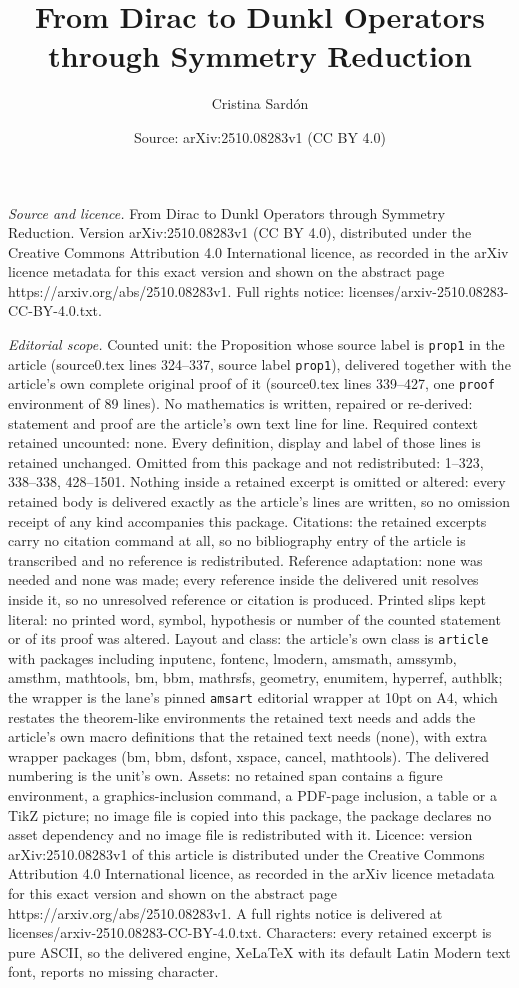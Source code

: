\documentclass[10pt,a4paper]{amsart}
\title[From Dirac to Dunkl Operators through Symmetry Reduction]{From Dirac to Dunkl Operators through Symmetry Reduction}
\author{Cristina Sard\'on}
\date{Source: arXiv:2510.08283v1 (CC BY 4.0)}
\begin{document}
\maketitle

\noindent\emph{Source and licence.} From Dirac to Dunkl Operators through Symmetry Reduction. Version arXiv:2510.08283v1 (CC BY 4.0), distributed under the Creative Commons Attribution 4.0 International licence, as recorded in the arXiv licence metadata for this exact version and shown on the abstract page https://arxiv.org/abs/2510.08283v1. Full rights notice: licenses/arxiv-2510.08283-CC-BY-4.0.txt.\par\smallskip

\noindent\textit{Editorial scope.} Counted unit: the Proposition whose source label is \texttt{prop1} in the article (source0.tex lines 324--337, source label \texttt{prop1}), delivered together with the article's own complete original proof of it (source0.tex lines 339--427, one \texttt{proof} environment of 89 lines). No mathematics is written, repaired or re-derived: statement and proof are the article's own text line for line. Required context retained uncounted: none. Every definition, display and label of those lines is retained unchanged. Omitted from this package and not redistributed: 1--323, 338--338, 428--1501. Nothing inside a retained excerpt is omitted or altered: every retained body is delivered exactly as the article's lines are written, so no omission receipt of any kind accompanies this package. Citations: the retained excerpts carry no citation command at all, so no bibliography entry of the article is transcribed and no reference is redistributed. Reference adaptation: none was needed and none was made; every reference inside the delivered unit resolves inside it, so no unresolved reference or citation is produced. Printed slips kept literal: no printed word, symbol, hypothesis or number of the counted statement or of its proof was altered. Layout and class: the article's own class is \texttt{article} with packages including inputenc, fontenc, lmodern, amsmath, amssymb, amsthm, mathtools, bm, bbm, mathrsfs, geometry, enumitem, hyperref, authblk; the wrapper is the lane's pinned \texttt{amsart} editorial wrapper at 10pt on A4, which restates the theorem-like environments the retained text needs and adds the article's own macro definitions that the retained text needs (none), with extra wrapper packages (bm, bbm, dsfont, xspace, cancel, mathtools). The delivered numbering is the unit's own. Assets: no retained span contains a figure environment, a graphics-inclusion command, a PDF-page inclusion, a table or a TikZ picture; no image file is copied into this package, the package declares no asset dependency and no image file is redistributed with it. Licence: version arXiv:2510.08283v1 of this article is distributed under the Creative Commons Attribution 4.0 International licence, as recorded in the arXiv licence metadata for this exact version and shown on the abstract page https://arxiv.org/abs/2510.08283v1. A full rights notice is delivered at licenses/arxiv-2510.08283-CC-BY-4.0.txt. Characters: every retained excerpt is pure ASCII, so the delivered engine, XeLaTeX with its default Latin Modern text font, reports no missing character.
\end{document}
